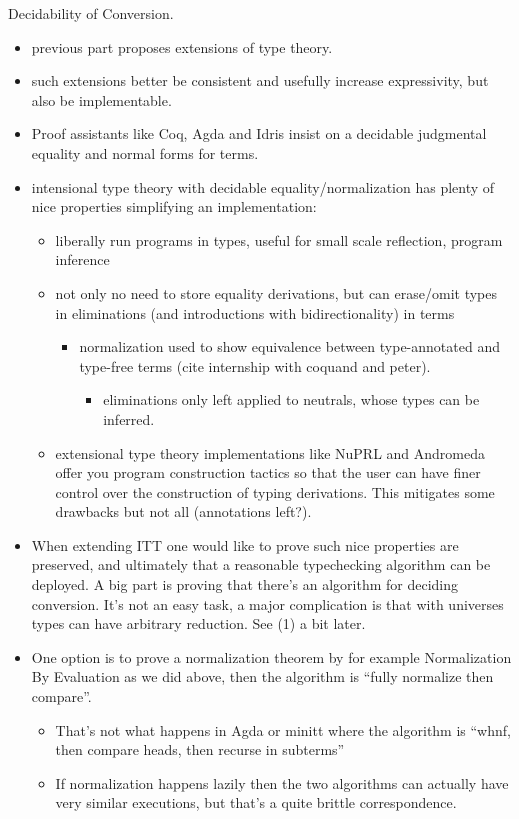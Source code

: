 \documentclass{book}
\begin{document}
Decidability of Conversion.
\begin{itemize}
 \item previous part proposes extensions of type theory.
 \item such extensions better be consistent and usefully increase expressivity, but also be implementable.
 \item Proof assistants like Coq, Agda and Idris insist on a decidable judgmental equality and normal forms for terms. 
 \item intensional type theory with decidable equality/normalization has plenty of nice properties simplifying an implementation:
   \begin{itemize}
   \item liberally run programs in types, useful for small scale reflection, program inference
   \item not only no need to store equality derivations, but can erase/omit types in eliminations (and introductions with bidirectionality) in terms
     \begin{itemize}
     \item normalization used to show equivalence between type-annotated and type-free terms (cite internship with coquand and peter).
         \begin{itemize}
         \item eliminations only left applied to neutrals, whose types can be inferred.
         \end{itemize}
     \end{itemize}
     
   \item extensional type theory implementations like NuPRL and Andromeda
   offer you program construction tactics so that the user can have finer control over the construction of typing derivations.
   This mitigates some drawbacks but not all (annotations left?).
   \end{itemize}

 \item When extending ITT one would like to prove such nice properties are
 preserved, and ultimately that a reasonable typechecking algorithm
 can be deployed. A big part is proving that there's an algorithm for
 deciding conversion. It's not an easy task, a major complication is that with universes types can have arbitrary reduction. See (1) a bit later.
 
 \item One option is to prove a normalization theorem by for example
   Normalization By Evaluation as we did above, then the algorithm is ``fully normalize then compare''.
   \begin{itemize}
   \item That's not what happens in Agda or minitt where the algorithm is ``whnf, then compare heads, then recurse in subterms''
   \item If normalization happens lazily then the two algorithms can actually have very similar executions, but that's a quite brittle correspondence.
   

\end{itemize}
\end{itemize}
\end{document}
